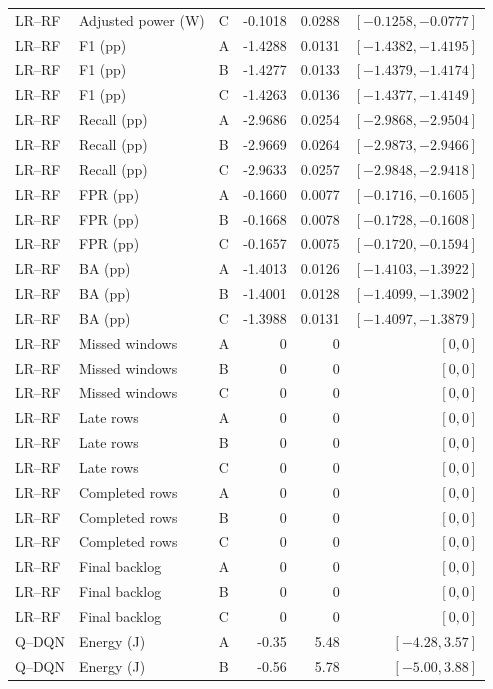 \begin{longtable}{lllrrr}
LR--RF & Adjusted power (W) & C & -0.1018 & 0.0288 & $[-0.1258,-0.0777]$\\
LR--RF & F1 (pp) & A & -1.4288 & 0.0131 & $[-1.4382,-1.4195]$\\
LR--RF & F1 (pp) & B & -1.4277 & 0.0133 & $[-1.4379,-1.4174]$\\
LR--RF & F1 (pp) & C & -1.4263 & 0.0136 & $[-1.4377,-1.4149]$\\
LR--RF & Recall (pp) & A & -2.9686 & 0.0254 & $[-2.9868,-2.9504]$\\
LR--RF & Recall (pp) & B & -2.9669 & 0.0264 & $[-2.9873,-2.9466]$\\
LR--RF & Recall (pp) & C & -2.9633 & 0.0257 & $[-2.9848,-2.9418]$\\
LR--RF & FPR (pp) & A & -0.1660 & 0.0077 & $[-0.1716,-0.1605]$\\
LR--RF & FPR (pp) & B & -0.1668 & 0.0078 & $[-0.1728,-0.1608]$\\
LR--RF & FPR (pp) & C & -0.1657 & 0.0075 & $[-0.1720,-0.1594]$\\
LR--RF & BA (pp) & A & -1.4013 & 0.0126 & $[-1.4103,-1.3922]$\\
LR--RF & BA (pp) & B & -1.4001 & 0.0128 & $[-1.4099,-1.3902]$\\
LR--RF & BA (pp) & C & -1.3988 & 0.0131 & $[-1.4097,-1.3879]$\\
LR--RF & Missed windows & A & 0 & 0 & $[0,0]$\\
LR--RF & Missed windows & B & 0 & 0 & $[0,0]$\\
LR--RF & Missed windows & C & 0 & 0 & $[0,0]$\\
LR--RF & Late rows & A & 0 & 0 & $[0,0]$\\
LR--RF & Late rows & B & 0 & 0 & $[0,0]$\\
LR--RF & Late rows & C & 0 & 0 & $[0,0]$\\
LR--RF & Completed rows & A & 0 & 0 & $[0,0]$\\
LR--RF & Completed rows & B & 0 & 0 & $[0,0]$\\
LR--RF & Completed rows & C & 0 & 0 & $[0,0]$\\
LR--RF & Final backlog & A & 0 & 0 & $[0,0]$\\
LR--RF & Final backlog & B & 0 & 0 & $[0,0]$\\
LR--RF & Final backlog & C & 0 & 0 & $[0,0]$\\
Q--DQN & Energy (J) & A & -0.35 & 5.48 & $[-4.28,3.57]$\\
Q--DQN & Energy (J) & B & -0.56 & 5.78 & $[-5.00,3.88]$\\

\end{longtable}
